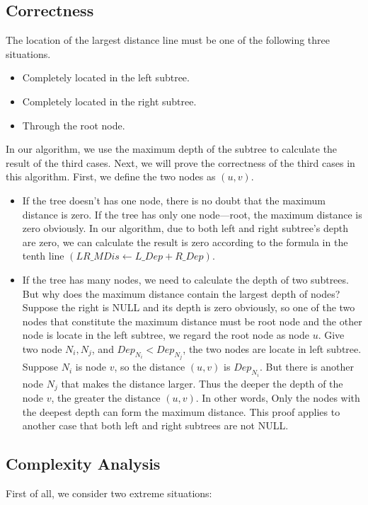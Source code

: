 \documentclass[UTF8,a4paper,12pt]{article}
\begin{document}
	\subsection{Correctness}
		The location of the largest distance line must be one of the following three situations.
		
		\begin{itemize}
			\item Completely located in the left subtree.
			\item Completely located in the right subtree.
			\item Through the root node.	
		\end{itemize}
	
		In our algorithm, we use the maximum depth of the subtree to calculate the result of the third cases. Next, we will prove the correctness of the third cases in this algorithm. First, we define the two nodes as $ (u,v) $.
		
		\begin{itemize}
			\item If the tree doesn't has one node, there is no doubt that the maximum distance is zero.
			If the tree has only one node---root, the maximum distance is zero obviously. In our algorithm, due to both left and right subtree's depth are zero, we can calculate the result is zero according to the formula in the tenth line $(  LR\_MDis \gets L\_Dep + R\_Dep )$.
			\item If the tree has many nodes, we need to calculate the depth of two subtrees. But why does the maximum distance contain the largest depth of nodes? Suppose the right is NULL and its depth is zero obviously, so one of the two nodes that constitute the maximum distance must be root node and the other node is locate in the left subtree, we regard the root node as node $ u $. Give two node $ N_{i},N_{j} $, and $ Dep_{N_{i}} < Dep_{N_{j}} $, the two nodes are locate in left subtree. Suppose $ N_{i} $ is node $ v $, so the distance $ (u,v) $ is $ Dep_{N_{i}} $. But there is another node $ N_{j} $ that makes the distance larger. Thus the deeper the depth of the node $ v $, the greater the distance $ (u,v) $. In other words, Only the nodes with the deepest depth can form the maximum distance. This proof applies to another case that both left and right subtrees are not NULL. 
		\end{itemize}
	
	\subsection{Complexity Analysis}
		First of all, we consider two extreme situations:
		
\end{document}
